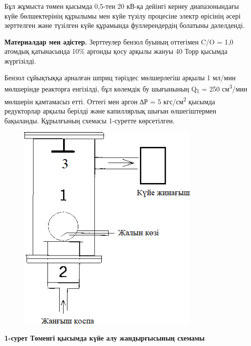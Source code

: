 Бұл жұмыста төмен қысымда 0,5-тен 20 кВ-қа дейінгі кернеу диапазонындағы
күйе бөлшектерінің құрылымы мен күйе түзілу процесіне электр өрісінің
әсері зерттелген және түзілген күйе құрамында фуллерендердің болатыны
дәлелденді.

{\bfseries Материалдар мен әдістер.} Зерттеулер бензол буының оттегімен C/O
= 1,0 атомдық қатынасында 10\% аргонды қосу арқылы жануы 40 Торр қысымда
жүргізілді.

Бензол сұйықтыққа арналған шприц тәріздес мөлшерлегіш арқылы 1 мл/мин
мөлшерінде реакторға енгізілді, бұл көлемдік бу шығынының
Q\textsubscript{1} = 250 см\textsuperscript{3}/мин мөлшерін қамтамасыз
етті. Оттегі мен аргон ∆Р = 5 кгс/см\textsuperscript{2} қысымда
редукторлар арқылы берілді және капиллярлық шығын өлшегіштермен
бақыланды. Құрылғының схемасы 1-суретте көрсетілген.

\begin{figure}[H]
	\centering
	\includegraphics[width=0.8\textwidth]{assets/23}
	\caption*{}
\end{figure}

{\bfseries 1-сурет Төменгі қысымда күйе алу жандырғысының схемамы}

